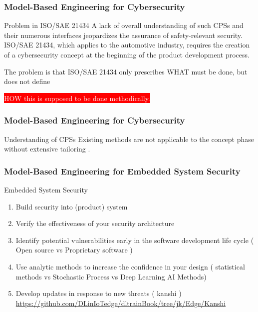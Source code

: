 \newpage 

\begin{frame}
\frametitle{Model-Based Engineering for Cybersecurity}

\begin{block}{Problem in ISO/SAE 21434  }
A lack of overall understanding of such CPSs and their numerous interfaces jeopardizes the assurance of safety-relevant security. ISO/SAE 21434, which applies to the automotive industry, requires the creation of a cybersecurity concept at the beginning of the product development process. 

The problem is that ISO/SAE 21434 only prescribes WHAT must be done, but does not define 

\colorbox{red}{ \textcolor{white}{HOW this is supposed to be done methodically.} }

\end{block}
\end{frame}

\newpage 

\begin{frame}
\frametitle{Model-Based Engineering for Cybersecurity}

\begin{block}{Understanding of CPSs  }
Existing methods are not applicable to the concept phase without extensive tailoring .

\end{block}
\end{frame}


\newpage 

\begin{frame}
\frametitle{Model-Based Engineering for Embedded System Security}

\begin{block}{Embedded System Security }

\begin{enumerate}
    \item Build security into (product)  system
     \item  Verify the effectiveness of your security architecture
 \item  Identify potential vulnerabilities early in the software development life cycle  ( Open source vs Proprietary software )
  \item  Use analytic methods to increase the confidence in your design
   ( statistical methods vs  Stochastic Process vs Deep Learning AI Methods)
 \item  Develop updates in response to new threats  ( kanshi ) 
 \url{https://github.com/DLinIoTedge/dltrainBook/tree/jk/Edge/Kanshi }
\end{enumerate}

\end{block}
\end{frame}


